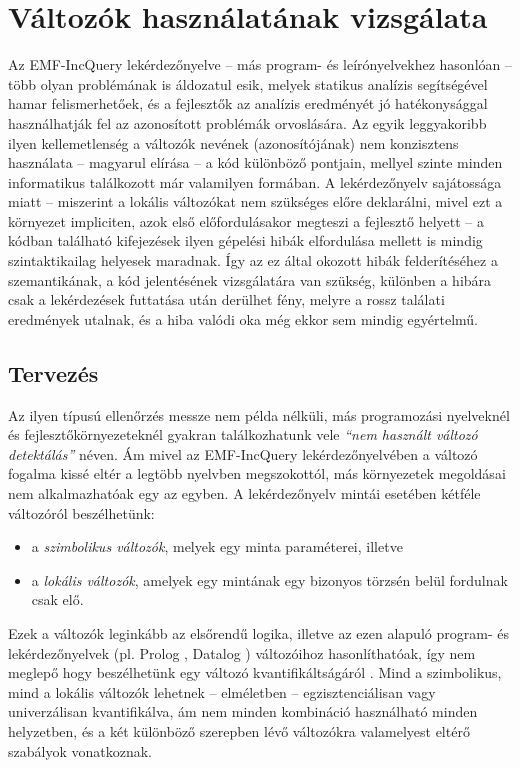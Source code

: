 \chapter{Változók használatának vizsgálata}
\label{chap:varUsage}
%
%
Az EMF-IncQuery lekérdezőnyelve -- más program- és leírónyelvekhez hasonlóan -- több olyan problémának is áldozatul esik, melyek statikus analízis segítségével hamar felismerhetőek, és a fejlesztők az analízis eredményét jó hatékonysággal használhatják fel az azonosított problémák orvoslására.
Az egyik leggyakoribb ilyen kellemetlenség a változók nevének (azonosítójának) nem konzisztens használata -- magyarul elírása -- a kód különböző pontjain, mellyel szinte minden informatikus találkozott már valamilyen formában.
A lekérdezőnyelv sajátossága miatt -- miszerint a lokális változókat nem szükséges előre deklarálni, mivel ezt a környezet impliciten, azok első előfordulásakor megteszi a fejlesztő helyett -- a kódban található kifejezések ilyen gépelési hibák elfordulása mellett is mindig szintaktikailag helyesek maradnak.
Így az ez által okozott hibák felderítéséhez a szemantikának, a kód jelentésének vizsgálatára van szükség, különben a hibára csak a lekérdezések futtatása után derülhet fény, melyre a rossz találati eredmények utalnak, és a hiba valódi oka még ekkor sem mindig egyértelmű.

\section{Tervezés}

Az ilyen típusú ellenőrzés messze nem példa nélküli, más programozási nyelveknél és fejlesztőkörnyezeteknél gyakran találkozhatunk vele \emph{``nem használt változó detektálás''} néven.
Ám mivel az EMF-IncQuery lekérdezőnyelvében a változó fogalma kissé eltér a legtöbb nyelvben megszokottól, más környezetek megoldásai nem alkalmazhatóak egy az egyben.
A lekérdezőnyelv mintái esetében kétféle változóról beszélhetünk:
\begin{itemize}
    \item a \emph{szimbolikus változók}, melyek egy minta paraméterei, illetve
    \item a \emph{lokális változók}, amelyek egy mintának egy bizonyos törzsén belül fordulnak csak elő.
\end{itemize}
Ezek a változók leginkább az elsőrendű logika, illetve az ezen alapuló program- és lekérdezőnyelvek (pl. Prolog \cite{Colmerauer93thebirth}, Datalog \cite{Ceri:1989:YAW:627272.627357}) változóihoz hasonlíthatóak, így nem meglepő hogy beszélhetünk egy változó kvantifikáltságáról \cite{Huth:2004:LCS:975331}.
Mind a szimbolikus, mind a lokális változók lehetnek -- elméletben -- egzisztenciálisan vagy univerzálisan kvantifikálva, ám nem minden kombináció használható minden helyzetben, és a két különböző szerepben lévő változókra valamelyest eltérő szabályok vonatkoznak.

